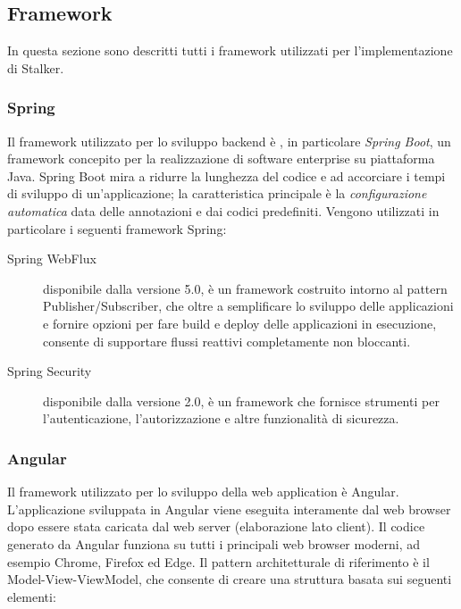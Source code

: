 \documentclass[../manuale-manutentore.tex]{subfiles}
\begin{document}
\subsection{Framework}%
\label{sub:framework}
In questa sezione sono descritti tutti i framework utilizzati per l'implementazione di Stalker.

\subsubsection{Spring}%
\label{subs:spring}

Il framework utilizzato per lo sviluppo backend è , in particolare \textit{Spring Boot}, un framework concepito per la realizzazione di software enterprise su piattaforma Java.
Spring Boot mira a ridurre la lunghezza del codice e ad accorciare i tempi di sviluppo di un'applicazione; la caratteristica principale è la \textit{configurazione automatica} data delle annotazioni e dai codici predefiniti.
Vengono utilizzati in particolare i seguenti framework Spring:

\begin{description}
  \item[Spring WebFlux] disponibile dalla versione 5.0, è un framework costruito intorno al pattern Publisher/Subscriber, che oltre a semplificare lo sviluppo delle applicazioni e fornire opzioni per fare build e deploy delle applicazioni in esecuzione, consente di supportare flussi reattivi completamente non bloccanti.
  \item[Spring Security] disponibile dalla versione 2.0, è un framework che fornisce strumenti per l'autenticazione, l'autorizzazione e altre funzionalità di sicurezza.
\end{description}

\subsubsection{Angular}%
\label{subs:angular}

Il framework utilizzato per lo sviluppo della web application è Angular.
L'applicazione sviluppata in Angular viene eseguita interamente dal web browser dopo essere stata caricata dal web server (elaborazione lato client).
Il codice generato da Angular funziona su tutti i principali web browser moderni, ad esempio Chrome, Firefox ed Edge.
Il pattern architetturale di riferimento è il Model-View-ViewModel, che consente di creare una struttura basata sui seguenti elementi:
\end{document}
